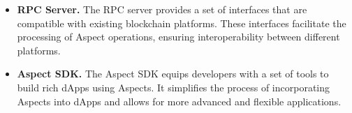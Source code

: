 \begin{itemize}
  \item \textbf{RPC Server.} The RPC server provides a set of interfaces that are compatible with existing blockchain platforms. These interfaces facilitate the processing of Aspect operations, ensuring interoperability between different platforms.
  
  \item \textbf{Aspect SDK.} The Aspect SDK equips developers with a set of tools to build rich dApps using Aspects. It simplifies the process of incorporating Aspects into dApps and allows for more advanced and flexible applications.
\end{itemize}